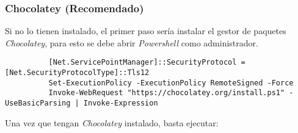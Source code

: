       \subsubsection{Chocolatey (Recomendado)}
        Si no lo tienen instalado, el primer paso sería instalar el gestor de paquetes 
        \textit{Chocolatey}, para esto se debe abrir \textit{Powershell} como 
        administrador.

        \begin{verbatim}
          [Net.ServicePointManager]::SecurityProtocol = [Net.SecurityProtocolType]::Tls12
          Set-ExecutionPolicy -ExecutionPolicy RemoteSigned -Force
          Invoke-WebRequest "https://chocolatey.org/install.ps1" -UseBasicParsing | Invoke-Expression
        \end{verbatim}

        Una vez que tengan \textit{Chocolatey} instalado, basta ejecutar:
%